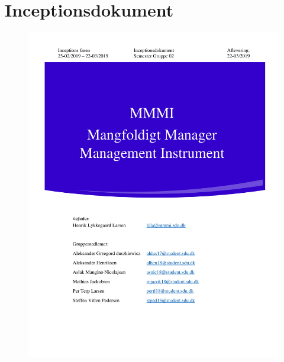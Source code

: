 \section{Inceptionsdokument}

\begin{figure}[hb]
\begin{center}
  \includegraphics[scale = 0.33]{./PNG/Inceptions/Gruppe 02 + InceptionsDokument-01.jpg} 
\end{center}
\end{figure}

